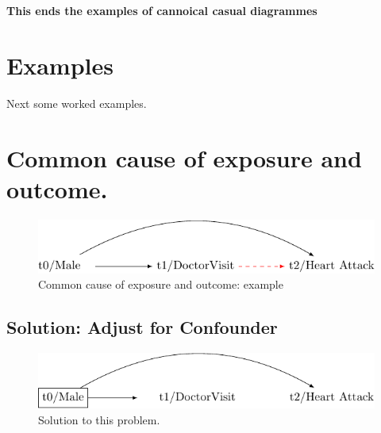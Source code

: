 \documentclass[
  singlecolumn]{report}
\begin{document}
\textbf{This ends the examples of cannoical casual diagrammes}

\hypertarget{examples}{%
\section{Examples}\label{examples}}

Next some worked examples.

\hypertarget{common-cause-of-exposure-and-outcome.}{%
\section{Common cause of exposure and
outcome.}\label{common-cause-of-exposure-and-outcome.}}

\begin{figure}

{\centering \includegraphics[width=1\textwidth,height=\textheight]{causal-dags_files/figure-pdf/fig-dag-1-1.pdf}

}

\caption{\label{fig-dag-1}Common cause of exposure and outcome: example}

\end{figure}

\hypertarget{solution-adjust-for-confounder}{%
\subsection{Solution: Adjust for
Confounder}\label{solution-adjust-for-confounder}}

\begin{figure}

{\centering \includegraphics[width=1\textwidth,height=\textheight]{causal-dags_files/figure-pdf/fig-dag-2-1.pdf}

}

\caption{\label{fig-dag-2}Solution to this problem.}

\end{figure}
\end{document}
